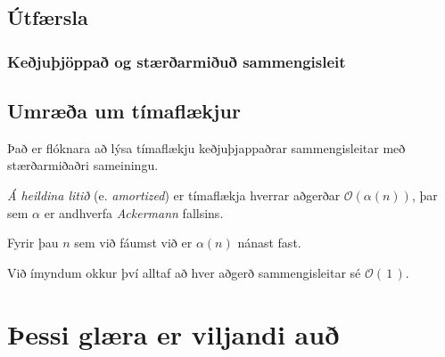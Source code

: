 \subsection{Útfærsla}
{
    \frametitle{Keðjuþjöppað og stærðarmiðuð sammengisleit}
}

\subsection{Umræða um tímaflækjur}
{
    {
        \item<1-> Það er flóknara að lýsa tímaflækju keðjuþjappaðrar sammengisleitar með stærðarmiðaðri sameiningu.
        \item<2-> \emph{Á heildina litið} (e. \emph{amortized}) er tímaflækja hverrar aðgerðar $\mathcal{O}(\alpha(n))$,
                    þar sem $\alpha$ er andhverfa \emph{Ackermann} fallsins.
        \item<3-> Fyrir þau $n$ sem við fáumst við er $\alpha(n)$ nánast fast.
        \item<4-> Við ímyndum okkur því alltaf að hver aðgerð sammengisleitar sé $\mathcal{O}(\,1\,)$.
    }
}

\section{Þessi glæra er viljandi auð}
{
}


